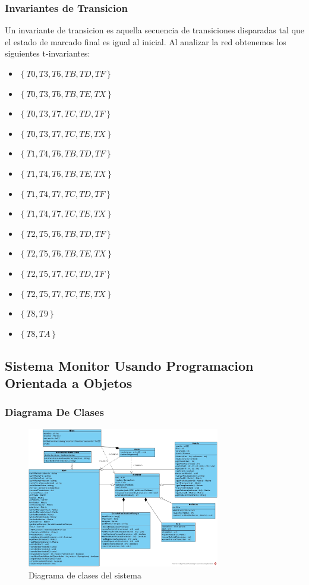 \documentclass{article}
\begin{document}
		\subsubsection{Invariantes de Transicion}
		Un invariante de transicion es aquella secuencia de transiciones disparadas tal que el estado de marcado final es igual al inicial. Al analizar la red obtenemos los siguientes t-invariantes:
		\begin{itemize}
		\item $\left\lbrace T0,T3,T6,TB,TD,TF \right\rbrace$
		\item $\left\lbrace T0,T3,T6,TB,TE,TX \right\rbrace$
		\item $\left\lbrace T0,T3,T7,TC,TD,TF \right\rbrace$
		\item $\left\lbrace T0,T3,T7,TC,TE,TX \right\rbrace$
		\item $\left\lbrace T1,T4,T6,TB,TD,TF \right\rbrace$
		\item $\left\lbrace T1,T4,T6,TB,TE,TX \right\rbrace$
		\item $\left\lbrace T1,T4,T7,TC,TD,TF \right\rbrace$
		\item $\left\lbrace T1,T4,T7,TC,TE,TX \right\rbrace$
		\item $\left\lbrace T2,T5,T6,TB,TD,TF \right\rbrace$
		\item $\left\lbrace T2,T5,T6,TB,TE,TX \right\rbrace$
		\item $\left\lbrace T2,T5,T7,TC,TD,TF \right\rbrace$
		\item $\left\lbrace T2,T5,T7,TC,TE,TX \right\rbrace$
		\item $\left\lbrace T8,T9 \right\rbrace$
		\item $\left\lbrace T8,TA \right\rbrace$
		\end{itemize}
	\subsection{Sistema Monitor Usando Programacion Orientada a Objetos}
		\subsubsection{Diagrama De Clases}
		\begin{figure}[H]
			\centering
			\includegraphics[width=0.75\textwidth]{Diagrama_de_Clase}
			\caption{Diagrama de clases del sistema}
			\label{fig:mesh2}
		\end{figure}
\end{document}
